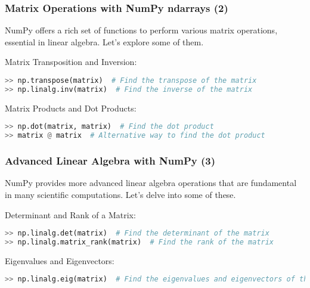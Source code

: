 \begin{frame}[fragile]
  \frametitle{Matrix Operations with NumPy ndarrays (2)}
  NumPy offers a rich set of functions to perform various matrix operations, essential in linear algebra. Let's explore some of them.\pause

  Matrix Transposition and Inversion:
  \begin{lstlisting}[language=Python, numbers=none]
>> np.transpose(matrix)  # Find the transpose of the matrix
>> np.linalg.inv(matrix)  # Find the inverse of the matrix
  \end{lstlisting}\pause

  Matrix Products and Dot Products:
  \begin{lstlisting}[language=Python, numbers=none]
>> np.dot(matrix, matrix)  # Find the dot product
>> matrix @ matrix  # Alternative way to find the dot product
  \end{lstlisting}
\end{frame}

\begin{frame}[fragile]
  \frametitle{Advanced Linear Algebra with NumPy (3)}
  NumPy provides more advanced linear algebra operations that are fundamental in many scientific computations. Let’s delve into some of these.\pause
  
  Determinant and Rank of a Matrix:
  \begin{lstlisting}[language=Python, numbers=none]
>> np.linalg.det(matrix)  # Find the determinant of the matrix
>> np.linalg.matrix_rank(matrix)  # Find the rank of the matrix
  \end{lstlisting}\pause
  
  Eigenvalues and Eigenvectors:
  \begin{lstlisting}[language=Python, numbers=none]
>> np.linalg.eig(matrix)  # Find the eigenvalues and eigenvectors of the matrix
  \end{lstlisting}
\end{frame}


